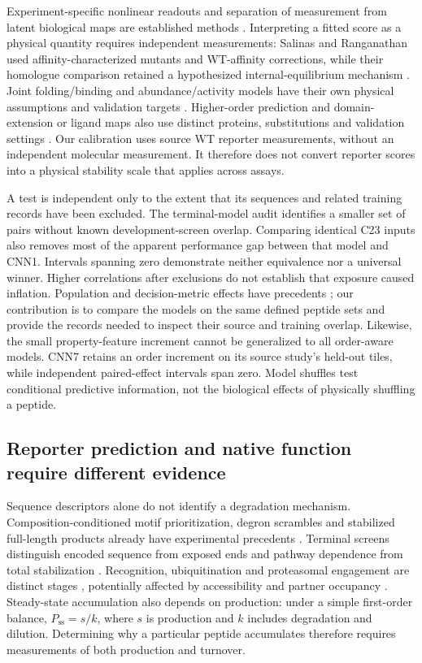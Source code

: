 \documentclass[11pt,a4paper]{article}
\begin{document}
Experiment-specific nonlinear readouts and separation of measurement from
latent biological maps are established methods \cite{schulze,mavenn,mochi}.
Interpreting a fitted score as a physical quantity requires independent measurements: Salinas and Ranganathan
used affinity-characterized mutants and WT-affinity corrections, while their
homologue comparison retained a hypothesized internal-equilibrium mechanism
\cite{salinas2018}. Joint folding/binding and abundance/activity models have
their own physical assumptions and validation targets
\cite{faureenergetic,leblancactivation}. Higher-order prediction and
domain-extension or ligand maps also use distinct proteins, substitutions
and validation settings \cite{architecture,pdzextensions,pdzcomparative}.
Our calibration uses source WT reporter measurements, without an independent molecular measurement. It therefore does not convert reporter scores into a physical stability scale that applies across assays.

A test is independent only to the extent that its sequences and related training records have been excluded. The terminal-model audit identifies a smaller set of pairs without known development-screen overlap. Comparing identical C23 inputs also removes most of the apparent performance gap between that model and CNN1. Intervals spanning zero demonstrate neither equivalence nor a universal
winner. Higher correlations after exclusions do not establish that exposure
caused inflation. Population and decision-metric effects have precedents
\cite{fawzy,gmma}; our contribution is to compare the models on the same defined peptide sets and provide the records needed to inspect their source and training overlap. Likewise, the small property-feature
increment cannot be generalized to all order-aware models. CNN7 retains an
order increment on its source study's held-out tiles, while independent
paired-effect intervals span zero. Model shuffles test conditional predictive
information, not the biological effects of physically shuffling a peptide.

\subsection{Reporter prediction and native function require different evidence}
Sequence descriptors alone do not identify a degradation mechanism.
Composition-conditioned motif prioritization, degron scrambles and stabilized
full-length products already have experimental precedents
\cite{zhanginternal,mashahreh,chu}. Terminal screens distinguish encoded
sequence from exposed ends and pathway dependence from total stabilization
\cite{koren,timms}. Recognition, ubiquitination and proteasomal engagement are
distinct stages \cite{tripartite}, potentially affected by accessibility and
partner occupancy \cite{hasenjaeger,guharoymasking}. Steady-state accumulation
also depends on production: under a simple first-order balance,
$P_{\mathrm{ss}}=s/k$, where $s$ is production and $k$ includes degradation
and dilution. Determining why a particular peptide accumulates therefore requires measurements of both production and turnover.
\end{document}
